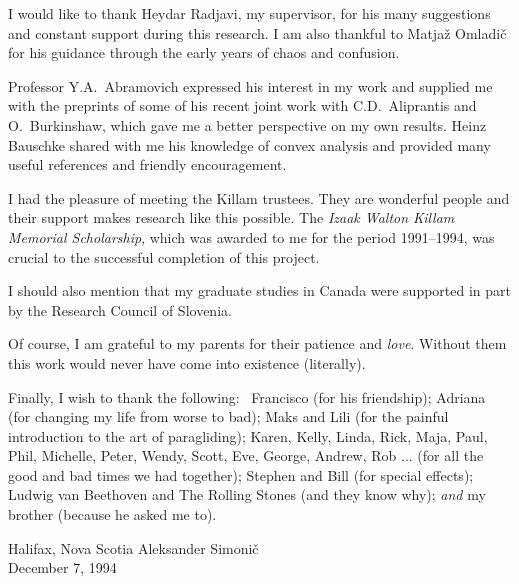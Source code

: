 
\def\baselinestretch{1.0}


I would like to thank Heydar Radjavi, my supervisor, for his many suggestions
and constant support during this research. I am also thankful to Matja\v{z}
Omladi\v{c} for his guidance through the early years of chaos and confusion.

Professor Y.A.~Abramovich expressed his interest in my work and supplied me
with the preprints of some of his recent joint work with C.D.~Aliprantis and
O.~Burkinshaw, which gave me a better perspective on my own results. Heinz
Bauschke shared with me his knowledge of convex analysis and provided many
useful references and friendly encouragement.

I had the pleasure of meeting the Killam trustees. They are wonderful people
and their support makes research like this possible. The {\em Izaak Walton
Killam Memorial Scholarship}, which was awarded to me for the period
1991--1994, was crucial to the successful completion of this project.

I should also mention that my graduate studies in Canada were supported in
part by the Research Council of Slovenia.

Of course, I am grateful to my parents for their patience and {\em love}.
Without them this work would never have come into existence (literally).

\medskip

Finally, I wish to thank the following: \, Francisco (for his friendship);
Adriana (for changing my life from worse to bad); Maks and Lili (for the
painful introduction to the art of paragliding); Karen, Kelly, Linda, Rick,
Maja, Paul, Phil, Michelle, Peter, Wendy, Scott, Eve, George, Andrew, Rob ...
(for all the good and bad times we had together); Stephen and Bill (for
special effects); Ludwig van Beethoven and The Rolling Stones (and they know
why); {\em and } my brother (because he asked me to).

\bigskip\medskip

\noindent
Halifax, Nova Scotia \hfill Aleksander Simoni\v{c}\\
December 7, 1994

